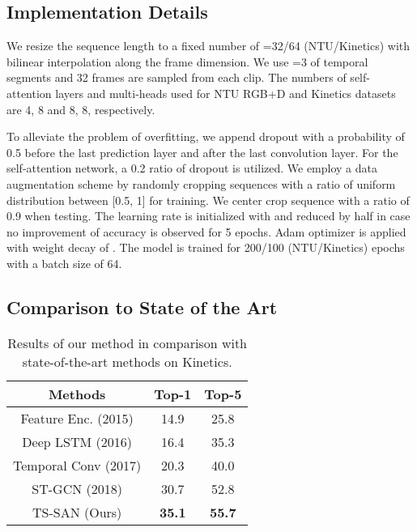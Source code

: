 \documentclass[10pt,twocolumn,letterpaper]{article}
\begin{document}
\subsection{Implementation Details}
 We resize the sequence length to a fixed number of =32/64 (NTU/Kinetics) with bilinear interpolation along the frame dimension. 
We use =3 of temporal segments and 32 frames are sampled from each clip. The numbers of self-attention layers and multi-heads used for NTU RGB+D and Kinetics datasets are 4, 8 and 8, 8, respectively. 

To alleviate the problem of overfitting, we append dropout with a probability of 0.5 before the last prediction layer and after the last convolution layer. For the self-attention network, a 0.2 ratio of dropout is utilized. We employ a data augmentation scheme by randomly cropping sequences with a ratio of uniform distribution between [0.5, 1] for training. We center crop sequence with a ratio of 0.9 when testing.
The learning rate is initialized with  and reduced by half in case no improvement of accuracy is observed for 5 epochs. Adam optimizer \cite{Adam} is applied with weight decay of . The model is trained for 200/100 (NTU/Kinetics) epochs with a batch size of 64.

\subsection{Comparison to State of the Art}

\begin{table}[t]
	\begin{center}
	\begin{tabular}{|c|c|c|}
		\hline
		Methods & Top-1 & Top-5\\
		\hline
		Feature Enc. \cite{STOA:FeatureEnc} (2015) & 14.9 & 25.8\\
		Deep LSTM \cite{STOA:PA-LSTM} (2016) & 16.4 & 35.3\\
		Temporal Conv \cite{STOA:Temporal_Conv} (2017) & 20.3 & 40.0\\
		ST-GCN \cite{STOA:stgcn} (2018) & 30.7 & 52.8\\
		\hline
		TS-SAN (Ours) &  \textbf{35.1}  & \textbf{55.7}  \\
		\hline
	\end{tabular}
	\end{center}
	\vspace{-0.15in}
	\caption{Results of our method in comparison with state-of-the-art methods on Kinetics.}
	\label{tab:kinetics}
\end{table}
\end{document}
